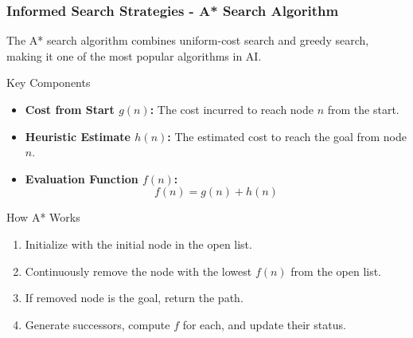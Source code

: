 \documentclass[aspectratio=169]{beamer}
\begin{document}
\begin{frame}[fragile]
    \frametitle{Informed Search Strategies - A* Search Algorithm}
    The A* search algorithm combines uniform-cost search and greedy search, making it one of the most popular algorithms in AI.

    \begin{block}{Key Components}
        \begin{itemize}
            \item \textbf{Cost from Start \( g(n) \):} The cost incurred to reach node \( n \) from the start.
            \item \textbf{Heuristic Estimate \( h(n) \):} The estimated cost to reach the goal from node \( n \).
            \item \textbf{Evaluation Function \( f(n) \):} 
            \begin{equation}
                f(n) = g(n) + h(n)
            \end{equation}
        \end{itemize}
    \end{block}

    \begin{block}{How A* Works}
        \begin{enumerate}
            \item Initialize with the initial node in the open list.
            \item Continuously remove the node with the lowest \( f(n) \) from the open list.
            \item If removed node is the goal, return the path.
            \item Generate successors, compute \( f \) for each, and update their status.
        \end{enumerate}
    \end{block}
\end{frame}
\end{document}
